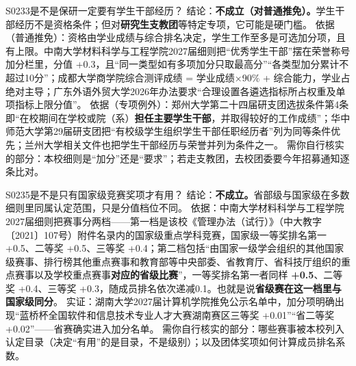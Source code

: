 \begin{qa}{S0233}{是不是保研一定要有学生干部经历？}
结论：\textbf{不成立（对普通推免）。}学生干部经历不是资格条件；但对\textbf{研究生支教团}等特定专项，它可能是硬门槛。
依据（普通推免）：资格由学业成绩与综合排名决定，学生工作至多是可选加分项，且有上限。中南大学材料科学与工程学院2027届细则把“优秀学生干部”摆在荣誉称号加分栏里，分值 +0.3，且“同一类型如有多项加分只取最高分”“各类型加分累计不超过10分”；成都大学商学院综合测评成绩 = 学业成绩×90\% + 综合能力，学业占绝对主导；广东外语外贸大学2026年办法要求“合理设置各遴选指标所占权重及单项指标上限分值”。
依据（专项例外）：郑州大学第二十四届研支团选拔条件第4条即“在校期间在学校或院（系）\textbf{担任主要学生干部}，并取得较好的工作成绩”；华中师范大学第29届研支团把“有校级学生组织学生干部任职经历者”列为同等条件优先；兰州大学相关文件也把学生干部经历与荣誉并列为条件之一。
需你自行核实的部分：本校细则是“加分”还是“要求”；若走支教团，去校团委要今年招募通知逐条比对。
\end{qa}

\begin{qa}{S0235}{是不是只有国家级竞赛奖项才有用？}
结论：\textbf{不成立。}省部级与国家级在多数细则里同属认定范围，只是分值档位不同。
依据：中南大学材料科学与工程学院2027届细则把赛事分两档——第一档是该校《管理办法（试行）》（中大教字〔2021〕107号）附件名录内的国家级重点学科竞赛，国家级一等奖排名第一 +0.5、二等奖 +0.5、三等奖 +0.4；第二档包括“由国家一级学会组织的其他国家级赛事、排行榜其他重点赛事和教育部等中央部委、省教育厅、省科技厅组织的重点赛事以及学校重点赛事\textbf{对应的省级比赛}”，一等奖排名第一者同样 \textbf{+0.5}、二等奖 +0.4、三等奖 +0.3，随成员排名依次递减0.1。也就是说\textbf{省级赛在这一档里与国家级同分}。
实证：湖南大学2027届计算机学院推免公示名单中，加分项明确出现“蓝桥杯全国软件和信息技术专业人才大赛湖南赛区三等奖 +0.01”“省二等奖 +0.02”——省赛确实进入加分名单。
需你自行核实的部分：哪些赛事被本校列入认定目录（决定“有用”的是目录，不是级别）；以及团体奖项如何计算成员排名系数。
\end{qa}

